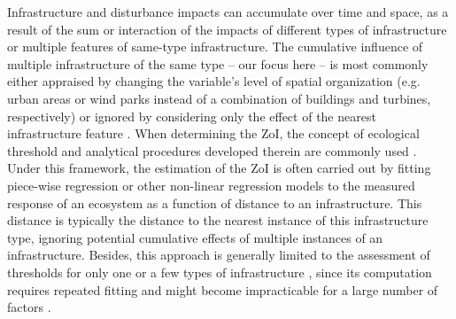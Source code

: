 \documentclass[titlepage]{article}
\begin{document}
Infrastructure and disturbance impacts can accumulate over time and space, as a result of the sum or interaction of the impacts of different types of infrastructure or multiple features of same-type infrastructure. 
The cumulative influence of multiple infrastructure of the same type -- our focus here -- is most commonly either appraised by changing the variable's level of spatial organization (e.g. urban areas or wind parks instead of a combination of buildings and turbines, respectively) or ignored by considering only the effect of the nearest infrastructure feature \citep[e.g.][]{torres_assessing_2016}. When determining the ZoI, the concept of ecological threshold %
and analytical procedures developed therein are commonly used \citep{ficetola_ecological_2009}. Under this framework, the estimation of the ZoI is often carried out by fitting piece-wise regression or other non-linear regression models \citep[such as an exponential decay or generalized additive models;][]{skarin_out_2018, ficetola_ecological_2009} to the measured response of an ecosystem as a function of distance to an infrastructure. This distance is typically the distance to the nearest instance of this infrastructure type, ignoring potential cumulative effects of multiple instances of an infrastructure. Besides, this approach is generally limited to the assessment of thresholds for only one or a few types of infrastructure \citep[e.g.][]{boulanger_estimating_2012}, since its computation requires repeated fitting and might become impracticable for a large number of factors \citep{lee_estimating_2020}. 
\end{document}
